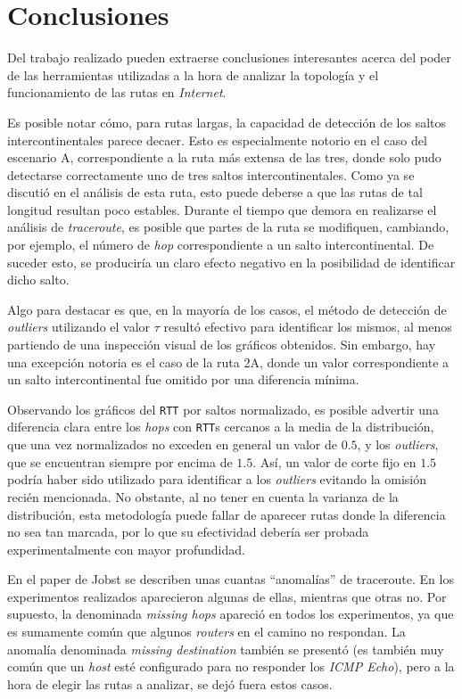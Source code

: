 \section{Conclusiones}

Del trabajo realizado pueden extraerse conclusiones interesantes acerca del
poder de las herramientas utilizadas a la hora de analizar la topología y el
funcionamiento de las rutas en \emph{Internet}.

Es posible notar cómo, para rutas largas, la capacidad de detección de los
saltos intercontinentales parece decaer. Esto es especialmente notorio en el
caso del escenario A, correspondiente a la ruta más extensa de las tres, donde
solo pudo detectarse correctamente uno de tres saltos intercontinentales. Como
ya se discutió en el análisis de esta ruta, esto puede deberse a que las
rutas de tal longitud resultan poco estables. Durante el tiempo que demora
en realizarse el análisis de \emph{traceroute}, es posible que partes de la
ruta se modifiquen, cambiando, por ejemplo, el número de \emph{hop}
correspondiente a un salto intercontinental. De suceder esto, se produciría
un claro efecto negativo en la posibilidad de identificar dicho salto.

Algo para destacar es que, en la mayoría de los casos, el método de detección
de \emph{outliers} utilizando el valor $\tau$ resultó efectivo para
identificar los mismos, al menos partiendo de una inspección visual de los
gráficos obtenidos. Sin embargo, hay una excepción notoria es el caso de la
ruta 2A, donde un valor correspondiente a un salto intercontinental fue
omitido por una diferencia mínima.

Observando los gráficos del \texttt{RTT} por saltos normalizado, es posible
advertir una diferencia clara entre los \emph{hops} con \texttt{RTT}s cercanos
a la media de la distribución, que una vez normalizados no exceden en general
un valor de $0.5$, y los \emph{outliers}, que se encuentran siempre por encima
de $1.5$. Así, un valor de corte fijo en $1.5$ podría haber sido utilizado
para identificar a los \emph{outliers} evitando la omisión recién mencionada.
No obstante, al no tener en cuenta la varianza de la distribución, esta
metodología puede fallar de aparecer rutas donde la diferencia no sea tan
marcada, por lo que su efectividad debería ser probada experimentalmente con
mayor profundidad.

En el paper de Jobst \cite{Jobst} se describen unas cuantas ``anomalías'' de
traceroute. En los experimentos realizados aparecieron algunas de ellas,
mientras que otras no. Por supuesto, la denominada \emph{missing hops}
apareció en todos los experimentos, ya que es sumamente común que algunos
\emph{routers} en el camino no respondan. La anomalía denominada \emph{missing
destination} también se presentó (es también muy común que un \emph{host} esté
configurado para no responder los \emph{ICMP Echo}), pero a la hora de elegir
las rutas a analizar, se dejó fuera estos casos.

